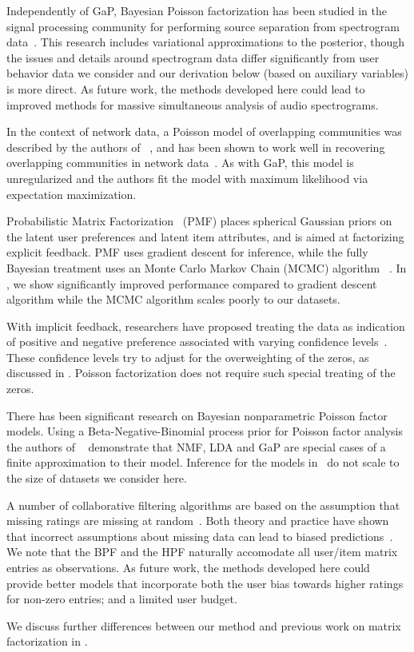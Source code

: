 Independently of GaP, Bayesian Poisson factorization has been studied
in the signal processing community for performing source separation
from spectrogram data~\cite{Cemgil:2009,Hoffman:2012}.  This research
includes variational approximations to the posterior, though the
issues and details around spectrogram data differ significantly from
user behavior data we consider and our derivation below (based on
auxiliary variables) is more direct.  As future work, the methods
developed here could lead to improved methods for massive simultaneous
analysis of audio spectrograms. 

In the context of network data, a Poisson model of overlapping
communities was described by the authors of ~\cite{Ball:2011}, and has
been shown to work well in recovering overlapping communities in
network data~\cite{Gopalan:2013}.  As with GaP, this model is
unregularized and the authors fit the model with maximum likelihood
via expectation maximization.

Probabilistic Matrix Factorization~\cite{Salakhutdinov:2008a} (PMF)
places spherical Gaussian priors on the latent user preferences and
latent item attributes, and is aimed at factorizing explicit feedback.
PMF uses gradient descent for inference, while the fully Bayesian
treatment uses an Monte Carlo Markov Chain (MCMC) algorithm
~\cite{Salakhutdinov:2008}.  In , we show significantly
improved performance compared to gradient descent algorithm while the
MCMC algorithm scales poorly to our datasets.

With implicit feedback, researchers have proposed treating the data as
indication of positive and negative preference associated with varying
confidence levels~\cite{Hu:2008p9402}. These confidence levels try to
adjust for the overweighting of the zeros, as discussed in
. Poisson factorization does not require such special
treating of the zeros.

There has been significant research on Bayesian nonparametric Poisson
factor models. Using a Beta-Negative-Binomial process prior for
Poisson factor analysis the authors of ~\cite{Zhou:2012} demonstrate
that NMF, LDA and GaP are special cases of a finite approximation to
their model. Inference for the models in~\cite{Zhou:2012} do not scale
to the size of datasets we consider here.

A number of collaborative filtering algorithms are based on the
assumption that missing ratings are missing at
random~\cite{Marlin:2012}. Both theory and practice have shown that
incorrect assumptions about missing data can lead to biased
predictions~\cite{Marlin:2009}. We note that the BPF and the HPF
naturally accomodate all user/item matrix entries as observations. As
future work, the methods developed here could provide better models
that incorporate both the user bias towards higher ratings for
non-zero entries; and a limited user budget.



We discuss further differences between our method and previous work on
matrix factorization in .


